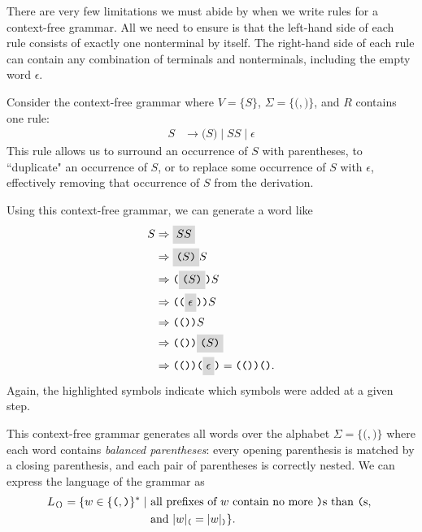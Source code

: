 There are very few limitations we must abide by when we write rules for a context-free grammar. All we need to ensure is that the left-hand side of each rule consists of exactly one nonterminal by itself. The right-hand side of each rule can contain any combination of terminals and nonterminals, including the empty word $\epsilon$.

\begin{example}\label{ex:balancedparens}
Consider the context-free grammar where $V = \{S\}$, $\Sigma = \{\texttt{(}, \texttt{)}\}$, and $R$ contains one rule:
\begin{align*}
S	&\rightarrow \texttt{(}S\texttt{)} \mid SS \mid \epsilon
\end{align*}
This rule allows us to surround an occurrence of $S$ with parentheses, to ``duplicate" an occurrence of $S$, or to replace some occurrence of $S$ with $\epsilon$, effectively removing that occurrence of $S$ from the derivation.

Using this context-free grammar, we can generate a word like
\begin{align*}
S 	&\Rightarrow \highlightmath{SS} \\
	&\Rightarrow \highlightmath{\texttt{(}S\texttt{)}}S \\
	&\Rightarrow \texttt{(}\highlightmath{\texttt{(}S\texttt{)}}\texttt{)}S \\
	&\Rightarrow \texttt{((}\highlightmath{\epsilon}\texttt{))}S \\
	&\Rightarrow \texttt{(())}S \\
	&\Rightarrow \texttt{(())}\highlightmath{\texttt{(}S\texttt{)}} \\
	&\Rightarrow \texttt{(())(}\highlightmath{\epsilon}\texttt{)} = \texttt{(())()}.
\end{align*}
Again, the highlighted symbols indicate which symbols were added at a given step.

This context-free grammar generates all words over the alphabet $\Sigma = \{\texttt{(}, \texttt{)}\}$ where each word contains \emph{balanced parentheses}: every opening parenthesis is matched by a closing parenthesis, and each pair of parentheses is correctly nested. We can express the language of the grammar as
\begin{align*}
L_{\texttt{()}} = \{w \in \{\texttt{(}, \texttt{)}\}^{*} \mid &\text{ all prefixes of } w \text{ contain no more \texttt{)}s than \texttt{(}s, } \\ 
	&\text{ and } |w|_{\texttt{(}} = |w|_{\texttt{)}}\}.
\end{align*}
\end{example}

